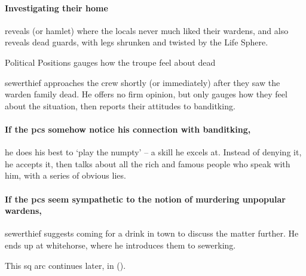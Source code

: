 \paragraph{Investigating their home}
reveals  (or hamlet) where the locals never much liked their \glspl{warden}, and also reveals dead guards, with legs shrunken and twisted by the Life Sphere.

{Political Positions}%
{ gauges how the troupe feel about dead }%
\label{politicalPositions}

\Gls{sewerthief} approaches the crew shortly (or immediately) after they saw the \gls{warden} family dead.
He offers no firm opinion, but only gauges how they feel about the situation, then reports their attitudes to \gls{banditking}.

\paragraph{If the \glspl{pc} somehow notice his connection with \gls{banditking},}
he does his best to `play the numpty' -- a skill he excels at.
Instead of denying it, he accepts it, then talks about all the rich and famous people who speak with him, with a series of obvious lies.

\paragraph{If the \glspl{pc} seem sympathetic to the notion of murdering unpopular \glspl{warden},}
\gls{sewerthief} suggests coming for a drink in \gls{town} to discuss the matter further.
He ends up at \gls{whitehorse}, where he introduces them to \gls{sewerking}.

\bigLine

This \gls{sq} arc continues later, in  ().

